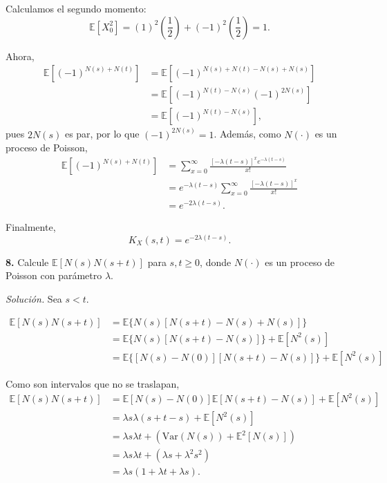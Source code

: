 \documentclass[12pt]{article}
\newcommand{\E}{\mathbb{E}}
\begin{document}
Calculamos el segundo momento:
\[ \E[X_0^2] = (1)^2\left(\frac{1}{2}\right) + (-1)^2\left(\frac{1}{2}\right) = 1. \]

Ahora,
\begin{align*}
    \E[(-1)^{N(s)+N(t)}] &= \E[(-1)^{N(s)+N(t)-N(s)+N(s)}] \\
    &= \E[(-1)^{N(t)-N(s)} (-1)^{2N(s)}] \\
    &= \E[(-1)^{N(t)-N(s)}],
\end{align*}
pues $2N(s)$ es par, por lo que $(-1)^{2N(s)} = 1$. Además, como $N(\cdot)$ es un proceso de Poisson,
\begin{align*}
    \E[(-1)^{N(s)+N(t)}] &= \sum_{x=0}^{\infty} \frac{[-\lambda(t-s)]^x e^{-\lambda(t-s)}}{x!} \\
    &= e^{-\lambda(t-s)} \sum_{x=0}^{\infty} \frac{[-\lambda(t-s)]^x}{x!} \\
    &= e^{-2\lambda(t-s)}.
\end{align*}

Finalmente,
\[ K_X(s,t) = e^{-2\lambda(t-s)}.\]



\begin{tcolorbox}[colback=blue!5!white, colframe=blue!5!white, arc=0mm, boxrule=0pt]
\textbf{8.} Calcule $\E[N(s)N(s+t)]$ para $s,t\geq 0$, donde $N(\cdot)$ es un proceso de Poisson con parámetro $\lambda$.
\end{tcolorbox}

\textit{Solución.} Sea $s < t$. 

\begin{align*}
    \E[N(s)N(s+t)] &= \E\{ N(s)[N(s+t)-N(s)+N(s)] \} \\
    &= \E\{ N(s)[N(s+t)-N(s)] \} + \E[N^2(s)] \\
    &= \E\{ [N(s)-N(0)][N(s+t)-N(s)] \} + \E[N^2(s)]
\end{align*}

Como son intervalos que no se traslapan,
\begin{align*}
    \E[N(s)N(s+t)] &= \E[N(s)-N(0)]\E[N(s+t)-N(s)] + \E[N^2(s)] \\
    &= \lambda s \lambda(s+t-s) + \E[N^2(s)] \\
    &= \lambda s \lambda t + (\textrm{Var}(N(s))+ \E^2[N(s)]) \\
    &= \lambda s \lambda t + (\lambda s + \lambda ^2 s^2) \\
    &= \lambda s (1 + \lambda t + \lambda s).
\end{align*}
\end{document}
